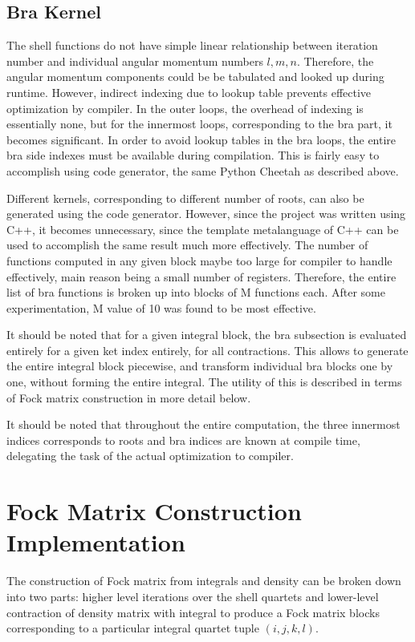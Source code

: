 \documentclass[12pt]{article}
\begin{document}
\subsection*{Bra Kernel}
The shell functions do not have simple linear relationship between iteration
number and individual angular momentum numbers $l,m,n$.  Therefore, the angular
momentum components could be be tabulated and looked up during runtime.
However, indirect indexing due to lookup table prevents effective optimization by
compiler. In the outer loops, the overhead of indexing is essentially none,
but for the innermost loops, corresponding to  the bra part, it becomes significant.
In order to avoid lookup tables in the bra loops, the entire bra side indexes must
be available during compilation.  This is fairly easy to accomplish using code
generator, the same Python Cheetah as described above.

Different kernels, corresponding to different number of roots, can also be
generated using the code generator.  However, since the project was written
using C++, it becomes unnecessary, since the template metalanguage of C++ can be
used to accomplish the same result much more effectively.  The number of
functions computed in any given block maybe too large for compiler to handle
effectively, main reason being a small number of registers.  Therefore, the entire
list of bra functions is broken up into blocks of M functions each.  After
some experimentation, M value of 10 was found to be most effective.

It should be noted that for a given integral block, the bra subsection is
evaluated entirely for a given ket index entirely, for all contractions.  This
allows to generate the entire integral block piecewise, and transform individual
bra blocks one by one, without forming the entire integral.  The utility of
this is described in terms of Fock matrix construction in more detail below.

It should be noted that throughout the entire computation, the three
innermost indices corresponds to roots and bra indices are known at
compile time, delegating the task of the actual optimization to compiler.

\section*{Fock Matrix Construction Implementation}
The construction of Fock matrix \cite{furlani_implementation_1995}
from integrals and density can be broken down into two parts: higher
level iterations over the shell quartets and lower-level
contraction of density matrix with integral to produce a Fock matrix
blocks corresponding to a particular integral quartet tuple $(i,j,k,l)$.
\end{document}
